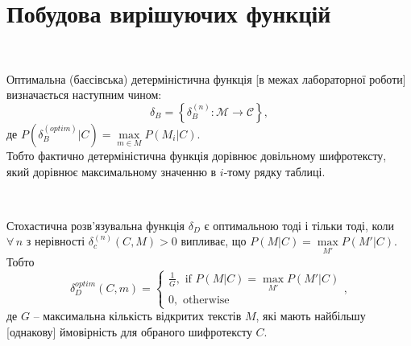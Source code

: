 \section{Побудова вирішуючих функцій}
\begin{definition}    
    ~\par Оптимальна (баєсівська) детерміністична функція [в межах лабораторної роботи] визначається наступним чином: 
    \begin{equation*}
        \delta_{B} = \left\{\delta_{B}^{(n)} : \mathcal{M} \rightarrow \mathcal{C}\right\}, 
    \end{equation*}
    де $P \left(\delta_{B}^{(optim)} \vert C\right) = \max\limits_{m \in M} P \left(M_{i} \vert C\right)$. \\ 
    Тобто фактично детерміністична функція дорівнює довільному шифротексту, який дорівнює максимальному значенню в 
    $i$-тому рядку таблиці.
\end{definition}
\begin{definition}
    ~\par Стохастична розв'язувальна функція $\delta_{D}$ є оптимальною тоді і тільки тоді, коли $\forall \, n$ 
    з нерівності $\delta_{c}^{(n)} \left(C, M\right) > 0$ випливає, що $P \left(M \vert C\right) = \max\limits_{M'} P \left(M' \vert C\right)$.
    Тобто 
    \begin{equation*}
        \delta_{D}^{optim} \left(C, m\right) = 
        \begin{cases}
            \frac{1}{G}, \text{ if } P \left(M \vert C\right) = \max\limits_{M'} P \left(M' \vert C\right) \\
            0, \text{ otherwise}
        \end{cases},
    \end{equation*}
    де $G$ -- максимальна кількість відкритих текстів $M$, які мають найбільшу [однакову] ймовірність для обраного шифротексту $C$.
\end{definition}
\newpage


